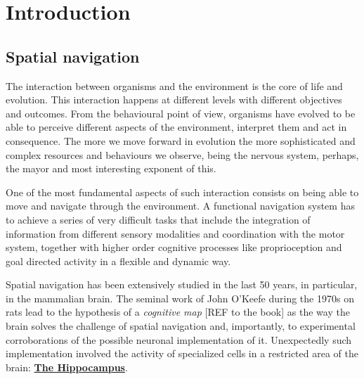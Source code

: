 
\chapter{Introduction} %

\label{Chapter1} %





\section{Spatial navigation}
\label{chap1:sec1:spatial_navigation}

The interaction between organisms and the environment is the core of life and evolution. This interaction happens at different levels with different objectives and outcomes. 
From the behavioural point of view, organisms have evolved to be able to perceive different aspects of the environment, interpret them and act in consequence. 
The more we move forward in evolution the more sophisticated and complex resources and behaviours we observe, being the nervous system, perhaps, the mayor and most interesting exponent of this. 

One of the most fundamental aspects of such interaction consists on being able to move and navigate through the environment.
A functional navigation system has to achieve a series of very difficult tasks that include the integration of information from different sensory modalities and coordination with the motor system, together with higher order cognitive processes like proprioception and goal directed activity in a flexible and dynamic way.

Spatial navigation has been extensively studied in the last 50 years, in particular, in the mammalian brain. 
The seminal work of John O'Keefe during the 1970s on rats lead to the hypothesis of a \textit{cognitive map} [REF to the book] as the way the brain solves the challenge of spatial navigation and, importantly, to experimental corroborations of the possible neuronal implementation of it. 
Unexpectedly such implementation involved the activity of specialized cells in a restricted area of the brain: \hyperref[chap1:sec:1:subsec1:hippocampus]{\textbf{The Hippocampus}}.

